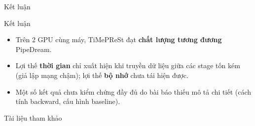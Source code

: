 \documentclass[10pt,aspectratio=169]{beamer}
\newcommand{\highlight}[1]{\textcolor{accent}{\bfseries #1}}
\begin{document}
\begin{frame}{Kết luận}
\begin{uitbox}{\faFlag\; Kết luận}
\footnotesize
\begin{itemize}
  \item Trên 2 GPU cùng máy, TiMePReSt đạt \highlight{chất lượng tương đương} PipeDream.
  \item Lợi thế \highlight{thời gian} chỉ xuất hiện khi truyền dữ liệu giữa các stage tốn kém (giả lập mạng chậm); lợi thế \highlight{bộ nhớ} chưa tái hiện được.
  \item Một số kết quả chưa kiểm chứng đầy đủ do bài báo thiếu mô tả chi tiết (cách tính backward, cấu hình baseline).
\end{itemize}
\end{uitbox}
\vspace{0.15cm}
\begin{uitbox}{\faBook\; Tài liệu tham khảo}
\tiny


\end{uitbox}
\end{frame}
\end{document}

